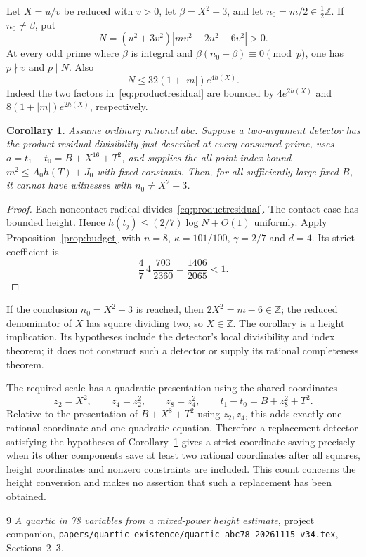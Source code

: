 \documentclass[11pt]{article}
\newcommand{\Z}{\mathbb Z}
\newtheorem{corollary}[theorem]{Corollary}
\begin{document}
Let $X=u/v$ be reduced with $v>0$, let $\beta=X^2+3$, and let
$n_0=m/2\in\tfrac12\Z$. If $n_0\ne\beta$, put
\begin{equation}\label{eq:productresidual}
 N=(u^2+3v^2)\left|mv^2-2u^2-6v^2\right|>0.
\end{equation}
At every odd prime where $\beta$ is integral and
$\beta(n_0-\beta)\equiv0\pmod p$, one has $p\nmid v$ and
$p\mid N$. Also
\begin{equation}\label{eq:Nbound}
                    N\le32(1+|m|)e^{4h(X)}.
\end{equation}
Indeed the two factors in~\eqref{eq:productresidual} are bounded by
$4e^{2h(X)}$ and $8(1+|m|)e^{2h(X)}$, respectively.

\begin{corollary}\label{cor:product}
Assume ordinary rational $abc$. Suppose a two-argument detector has
the product-residual divisibility just described at every consumed
prime, uses $a=t_1-t_0=B+X^{16}+T^2$, and supplies the all-point
index bound $m^2\le A_0h(T)+J_0$ with fixed constants.
Then, for all sufficiently large fixed $B$, it cannot have witnesses
with $n_0\ne X^2+3$.
\end{corollary}
\begin{proof}
Each noncontact radical divides~\eqref{eq:productresidual}.
The contact case has bounded height. Hence
$h(t_j)\le(2/7)\log N+O(1)$ uniformly. Apply
Proposition~\ref{prop:budget} with $n=8$, $\kappa=101/100$,
$\gamma=2/7$ and $d=4$. Its strict coefficient is
\[
        \frac47\,4\,\frac{703}{2360}
                 =\frac{1406}{2065}<1.
\]
\end{proof}

If the conclusion $n_0=X^2+3$ is reached, then $2X^2=m-6\in\Z$;
the reduced denominator of $X$ has square dividing two, so $X\in\Z$.
The corollary is a height implication. Its hypotheses include the
detector's local divisibility and index theorem; it does not construct
such a detector or supply its rational completeness theorem.

The required scale has a quadratic presentation using the shared
coordinates
\[
 z_2=X^2,\qquad z_4=z_2^2,\qquad z_8=z_4^2,
 \qquad t_1-t_0=B+z_8^2+T^2.
\]
Relative to the presentation of $B+X^8+T^2$ using $z_2,z_4$, this
adds exactly one rational coordinate and one quadratic equation.
Therefore a replacement detector satisfying the hypotheses of
Corollary~\ref{cor:product} gives a strict coordinate saving precisely
when its other components save at least two rational coordinates after
all squares, height coordinates and nonzero constraints are included.
This count concerns the height conversion and makes no assertion that
such a replacement has been obtained.

\begin{thebibliography}{9}
\emph{A quartic in 78 variables from a mixed-power height estimate},
project companion,
\nolinkurl{papers/quartic_existence/quartic_abc78_20261115_v34.tex},
Sections~2--3.
\end{thebibliography}
\end{document}
